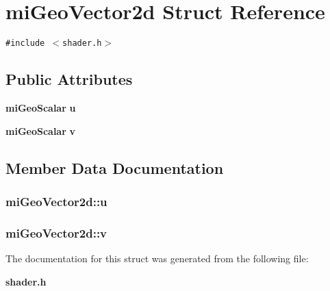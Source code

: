 \section{mi\-Geo\-Vector2d Struct Reference}
\label{structmiGeoVector2d}
{\tt \#include $<$shader.h$>$}

\subsection*{Public Attributes}
\begin{CompactItemize}
\item 
{\bf mi\-Geo\-Scalar} {\bf u}
\item 
{\bf mi\-Geo\-Scalar} {\bf v}
\end{CompactItemize}


\subsection{Member Data Documentation}
\subsubsection{ {\bf mi\-Geo\-Vector2d::u}}\label{structmiGeoVector2d_o0}


\subsubsection{ {\bf mi\-Geo\-Vector2d::v}}\label{structmiGeoVector2d_o1}




The documentation for this struct was generated from the following file:\begin{CompactItemize}
\item 
{\bf shader.h}\end{CompactItemize}
